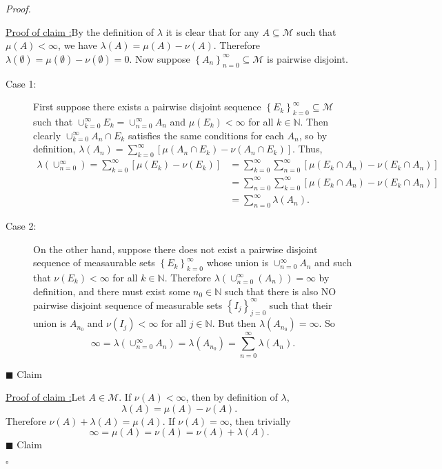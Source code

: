 \documentclass[12pt]{article}
\newcounter{ProofCounter}
\newcounter{ClaimCounter}[ProofCounter]
\newenvironment{Proof}{\stepcounter{ProofCounter}\textit{Proof.}}{\hfill$\square$}
\newenvironment{claim}[1]{\vspace{1mm}\stepcounter{ClaimCounter}\par\noindent\underline{\bf Claim \theClaimCounter:}\space#1}{}
\newenvironment{claimproof}[1]{\par\noindent\underline{Proof of claim \theClaimCounter:}\space#1}{\hfill $\blacksquare$ Claim \theClaimCounter}
\begin{document}
\begin{Proof}
\begin{claimproof}
By the definition of $\lambda$ it is clear that for any $A \subseteq \mathcal{M}$ such that $\mu(A) < \infty$, we have $\lambda(A) = \mu(A) - \nu(A)$.
Therefore $\lambda(\emptyset) = \mu(\emptyset) - \nu(\emptyset) = 0$. Now suppose $\left\{ A_{n} \right\}_{n=0}^{\infty} \subseteq \mathcal{M}$ is
pairwise disjoint.
\begin{description}
\item[Case 1:] First suppose there exists a pairwise disjoint sequence $\left\{ E_{k} \right\}_{k=0}^{\infty} \subseteq \mathcal{M}$ such that
$\cup_{k=0}^{\infty}E_{k} = \cup_{n=0}^{\infty}A_{n}$ and $\mu(E_{k}) < \infty$ for all $k \in \mathbb{N}$. Then clearly $\cup_{k=0}^{\infty}A_{n}\cap
E_{k}$ satisfies the same conditions for each $A_{n}$, so by definition, $\lambda(A_{n}) = \sum_{k=0}^{\infty}[\mu(A_{n}\cap E_{k}) - \nu(A_{n}\cap
E_{k})]$. Thus,
\begin{align*}
\lambda\left( \cup_{n=0}^{\infty} \right) = \sum_{k=0}^{\infty}[\mu(E_{k}) - \nu(E_{k})] & = \sum_{k=0}^{\infty}
\sum_{n=0}^{\infty}\left[\mu(E_{k}\cap A_{n}) - \nu(E_{k} \cap A_{n}) \right] \\
& = \sum_{n=0}^{\infty}\sum_{k=0}^{\infty}\left[ \mu(E_{k}\cap A_{n}) - \nu(E_{k} \cap A_{n}) \right] \\
& = \sum_{n=0}^{\infty}\lambda(A_{n}).
\end{align*}
\item[Case 2:] On the other hand, suppose there does not exist a pairwise disjoint sequence of measaurable sets $\left\{ E_{k}
\right\}_{k=0}^{\infty}$ whose union is $\cup_{n=0}^{\infty}A_{n}$ and such that $\nu(E_{k}) < \infty$ for all $k \in \mathbb{N}$. Therefore
$\lambda\left( \cup_{n=0}^{\infty}(A_{n}) \right) = \infty$ by definition, and there must exist some $n_{0} \in \mathbb{N}$ such that there is also NO
pairwise disjoint sequence of measurable sets $\left\{ I_{j} \right\}_{j=0}^{\infty}$ such that their union is $A_{n_{0}}$ and $\nu(I_{j}) < \infty$ for all $j \in
\mathbb{N}$. But then $\lambda(A_{n_0}) = \infty$. So 
\[ \infty = \lambda\left( \cup_{n=0}^{\infty}A_{n} \right) = \lambda(A_{n_0}) = \sum_{n=0}^{\infty}\lambda(A_{n}). \]
\end{description}
\end{claimproof}

\begin{claimproof}
Let $A \in \mathcal{M}$. If $\nu(A) < \infty$, then by definition of $\lambda$,
\[ \lambda(A) = \mu(A) - \nu(A). \]
Therefore $\nu(A) + \lambda(A) = \mu(A)$. If $\nu(A) = \infty$, then trivially
\[ \infty = \mu(A) = \nu(A) = \nu(A) + \lambda(A). \]
\end{claimproof}

\end{Proof}
\end{document}
